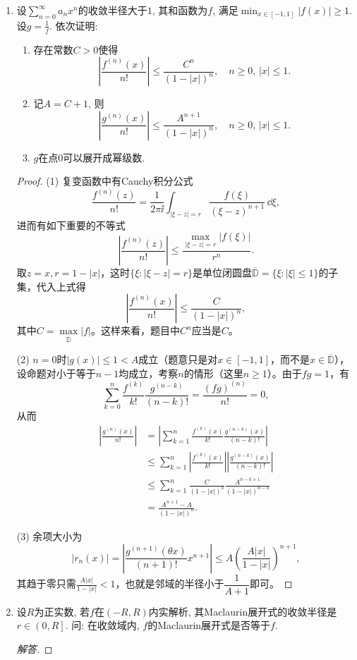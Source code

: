 \begin{quiza}
\begin{enumerate}
于是
\[(1+x)^\alpha=\sum_{k=0}^{\infty}\binom{\alpha}{k}x^k,\qquad x\in(-1,1).\]
即 \((1+x)^\alpha\) 在 \((-1,1)\) 内可展开成 Maclaurin 级数.
\item 设\(\sum_{n=0}^{\infty}a_nx^n\)的收敛半径大于\(1\), 其和函数为\(f\), 
满足\(\min_{x\in [-1,1]}\left|f(x)\right|\geqslant 1\). 设\(g=\frac{1}{f}\). 依次证明:
\begin{enumerate}[label=(\arabic*)]
\item 存在常数\(C>0\)使得\[\left|\frac{f^{(n)}(x)}{n!}\right|\leqslant \frac{C^n}{(1-|x|)^n},\quad n\geqslant 0,\,|x|\leqslant 1.\]
\item 记\(A=C+1\), 则\[\left|\frac{g^{(n)}(x)}{n!}\right|\leqslant\frac{A^{n+1}}{(1-|x|)^n},\quad n\geqslant 0,\,|x|\leqslant 1.\]
\item \(g\)在点\(0\)可以展开成幂级数.
\end{enumerate}
\begin{proof}
(1) 复变函数中有Cauchy积分公式
\[\frac{f^{(n)}(z)}{n!}=\frac{1}{2\pi\ii}\int_{|\xi-z|=r}\frac{f(\xi)}{(\xi-z)^{n+1}}\,\dd\xi,\]
进而有如下重要的不等式\[\left|\frac{f^{(n)}(z)}{n!}\right|\leqslant\frac{\max\limits_{|\xi-z|=r}|f(\xi)|}{r^n}.\]
取$z=x,r=1-|x|$，这时$\{\xi:|\xi-z|=r\}$是单位闭圆盘$\overline{\mathbb{D}}=\{\xi:|\xi|\leqslant1\}$的子集，代入上式得
\[\left|\frac{f^{(n)}(x)}{n!}\right|\leqslant\frac{C}{(1-|x|)^n},\]
其中$C=\max\limits_{\overline{\mathbb{D}}}|f|$。这样来看，题目中$C^n$应当是$C$。

(2) $n=0$时$|g(x)|\leqslant1<A$成立（题意只是对$x\in[-1,1]$，而不是$x\in\overline{\mathbb{D}}$），
设命题对小于等于$n-1$均成立，考察$n$的情形（这里$n\geqslant1$）。由于$fg=1$，有
\[\sum_{k=0}^{n}\frac{f^{(k)}}{k!}\frac{g^{(n-k)}}{(n-k)!}=\frac{(fg)^{(n)}}{n!}=0,\]
从而\begin{align*}\left|\frac{g^{(n)}(x)}{n!}\right|
&=\left|\sum_{k=1}^{n}\frac{f^{(k)}(x)}{k!}\frac{g^{(n-k)}(x)}{(n-k)!}\right|\\
&\leqslant\sum_{k=1}^{n}\left|\frac{f^{(k)}(x)}{k!}\right|\left|\frac{g^{(n-k)}(x)}{(n-k)!}\right|\\
&\leqslant\sum_{k=1}^{n}\frac{C}{(1-|x|)^k}\frac{A^{n-k+1}}{(1-|x|)^{n-k}}\\
&=\frac{A^{n+1}-A}{(1-|x|)^n}.
\end{align*}

(3) 余项大小为\[|r_n(x)|=\left|\frac{g^{(n+1)}(\theta x)}{(n+1)!}x^{n+1}\right|
\leqslant A\left(\frac{A|x|}{1-|x|}\right)^{n+1},\]
其趋于零只需\(\frac{A|x|}{1-|x|}<1\)，也就是邻域的半径小于\(\dfrac{1}{A+1}\)即可。
\end{proof}
\item 设\(R\)为正实数, 若\(f\)在\((-R,R)\)内实解析, 
其Maclaurin展开式的收敛半径是\(r\in \left(0,R\right]\). 
问: 在收敛域内, \(f\)的Maclaurin展开式是否等于\(f\).
\begin{proof}[解答]

\end{proof}
\end{enumerate}
\end{quiza}
